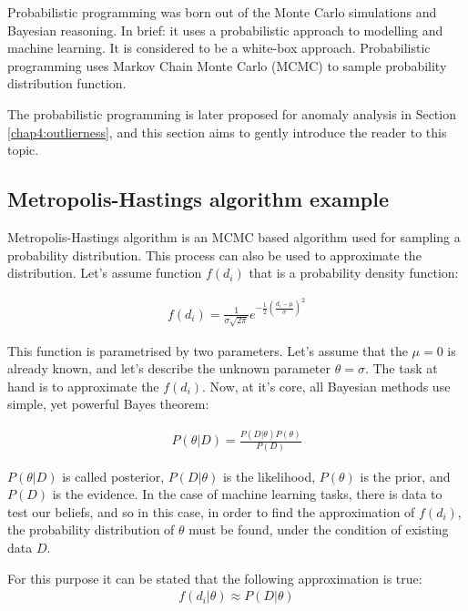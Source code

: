 Probabilistic programming \cite{davidsonpilon2015probabilistic} was born out of the Monte Carlo simulations and Bayesian reasoning. In brief: it uses a probabilistic approach to modelling and machine learning.
It is considered to be a white-box approach.
Probabilistic programming uses Markov Chain Monte Carlo (MCMC) to sample probability distribution function.

The probabilistic programming is later proposed for anomaly analysis in Section \ref{chap4:outlierness}, and this section aims to gently introduce the reader to this topic.



\subsection{Metropolis-Hastings algorithm example}

Metropolis-Hastings algorithm  \cite{Robert2004} is an MCMC based algorithm used for sampling a probability distribution.
This process can also be used to approximate the distribution.
Let's assume function $f(d_{i})$ that is a probability density function:

\begin{align}
f(d_{i}) = \frac{1}{\sigma \sqrt{2\pi} } e^{-\frac{1}{2}\left(\frac{d_{i}-\mu}{\sigma}\right)^2}
  \end{align}

This function is parametrised by two parameters.
Let's assume that the $\mu = 0$ is already known, and let's describe the unknown parameter $\theta = \sigma$.
The task at hand is to approximate the $f(d_i)$.
Now, at it's core, all Bayesian methods use simple, yet powerful Bayes theorem:

\begin{align}
  P(\theta|D) = \frac{P(D|\theta)P(\theta)}{P(D)}
\end{align}

$P(\theta|D)$ is called posterior, $P(D|\theta)$ is the likelihood, $P(\theta)$ is the prior, and $P(D)$ is the evidence.
In the case of machine learning tasks, there is data to test our beliefs, and so in this case, in order to find the approximation of $f(d_{i})$, the probability distribution of $\theta$ must be found, under the condition of existing data $D$.

For this purpose it can be stated that the following approximation is true:
\begin{align}
f(d_{i} | \theta) \approx P(D|\theta)
  \end{align}

